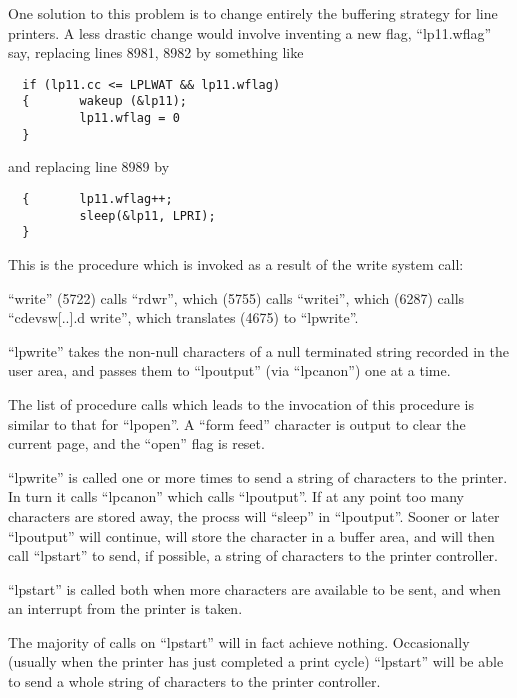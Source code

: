 One solution to this problem is to
change entirely the buffering strategy
for line printers. A less drastic
change would involve inventing a new
flag, ``lp11.wflag'' say, replacing lines
8981, 8982 by something like

\begin{verbatim}
  if (lp11.cc <= LPLWAT && lp11.wflag)
  {       wakeup (&lp11);
          lp11.wflag = 0
  }
\end{verbatim}

\noindent and replacing line 8989 by

\begin{verbatim}
  {       lp11.wflag++;
          sleep(&lp11, LPRI);
  }
\end{verbatim}


This is the procedure which is invoked
as a result of the write system call:

``write'' (5722) calls ``rdwr'',
which (5755) calls ``writei'',
which        (6287)         calls
``cdevsw[..].d write'',       which
translates (4675) to ``lpwrite''.

``lpwrite'' takes the non-null characters
of a null terminated string recorded in
the user area, and passes them to
``lpoutput'' (via ``lpcanon'') one at a
time.

The list of procedure calls which leads
to the invocation of this procedure is
similar to that for ``lpopen''. A ``form
feed'' character is output to clear the
current page, and the ``open'' flag is
reset.


``lpwrite'' is called one or more times
to send a string of characters to the
printer. In turn it calls ``lpcanon''
which calls ``lpoutput''. If at any point
too many characters are stored away,
the procss will ``sleep'' in ``lpoutput''.
Sooner or later ``lpoutput'' will continue, will store the character in a
buffer area, and will then call
``lpstart'' to send, if possible, a
string of characters to the printer
controller.

``lpstart'' is called both when more
characters are available to be sent,
and when an interrupt from the printer
is taken.

The majority of calls on ``lpstart'' will
in fact achieve nothing. Occasionally
(usually when the printer has just completed
a print cycle) ``lpstart'' will be
able to send a whole string of characters to the printer controller.


